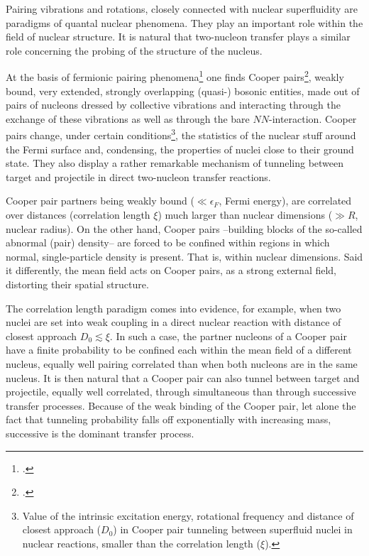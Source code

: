 Pairing vibrations and rotations, closely connected with nuclear superfluidity are  paradigms of quantal nuclear phenomena. They  play an important  role within the field of nuclear structure. It is natural that two-nucleon transfer plays a similar role concerning the probing of the structure of the nucleus.

 
At the basis of fermionic pairing phenomena\footnote{\cite{Bardeen:57a,Bardeen:57b}.} one finds Cooper pairs\footnote{\cite{Cooper:56}.}, weakly bound, very extended, strongly overlapping (quasi-) bosonic entities, made out of pairs of nucleons dressed by collective vibrations and interacting  through the exchange of these vibrations as well as through the bare $NN$-interaction.
Cooper pairs change, under certain conditions\footnote{Value of the intrinsic excitation energy, rotational frequency and distance of closest approach ($D_0$) in Cooper pair tunneling between superfluid nuclei in nuclear reactions, smaller than the correlation length ($\xi$).}, the statistics of the nuclear stuff around the Fermi surface and, condensing, the properties of nuclei close to their ground state. They also display a rather remarkable mechanism of tunneling between  target and projectile in  direct two-nucleon transfer reactions.


Cooper pair partners being weakly bound ($\ll \epsilon_F$, Fermi energy), are correlated over distances (correlation length $\xi$) much larger than nuclear dimensions ($\gg R$, nuclear radius). On the other hand, Cooper pairs --building blocks of the so-called abnormal (pair) density-- are forced to be confined within regions in which normal, single-particle density is present. That is, within nuclear dimensions. Said it differently, the mean field acts on Cooper pairs, as a strong external field,  distorting their spatial structure.


The correlation length paradigm comes into evidence, for example, when two nuclei are set into weak coupling  in a direct nuclear reaction with distance of closest approach $D_0\lesssim\xi$. In such a  case,  the partner nucleons of a Cooper pair have a finite probability to be confined each within the mean field of a different nucleus, equally well pairing correlated than when both nucleons are in the same nucleus. It is then natural that a Cooper pair can also tunnel between target and projectile, equally well correlated, through simultaneous than through successive transfer processes. Because of the weak binding of the Cooper pair, let alone the fact that tunneling probability falls off exponentially with increasing mass, successive is the dominant transfer process.
 
